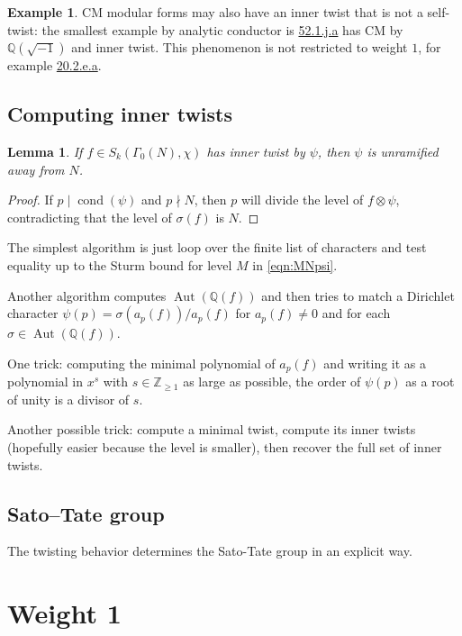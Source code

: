 \documentclass[11pt]{amsart}
\numberwithin{equation}{subsection}
\theoremstyle{plain}
\newtheorem{lem}[equation]{Lemma}
\theoremstyle{definition}
\newtheorem{exm}[equation]{Example}
\newcommand{\Q}{\mathbb{Q}}
\newcommand{\Z}{\mathbb{Z}}
\DeclareMathOperator{\Aut}{Aut}
\DeclareMathOperator{\cond}{cond}
\begin{document}
\begin{exm}
CM modular forms may also have an inner twist that is not a self-twist: the smallest example by analytic conductor is \href{http://cmfs.lmfdb.xyz/ModularForm/GL2/Q/holomorphic/52/1/j/a/}{\textsf{52.1.j.a}} has CM by $\Q(\sqrt{-1})$ and inner twist.  This phenomenon is not restricted to weight $1$, for example \href{http://cmfs.lmfdb.xyz/ModularForm/GL2/Q/holomorphic/20/2/e/a/}{\textsf{20.2.e.a}}.
\end{exm}

\subsection{Computing inner twists}

\begin{lem}
If $f \in S_k(\Gamma_0(N),\chi)$ has inner twist by $\psi$, then $\psi$ is unramified away from $N$.  
\end{lem}

\begin{proof}
If $p \mid \cond(\psi)$ and $p \nmid N$, then $p$ will divide the level of $f \otimes \psi$, contradicting that the level of $\sigma(f)$ is $N$. 
\end{proof}

The simplest algorithm is just loop over the finite list of characters and test equality up to the Sturm bound for level $M$ in \eqref{eqn:MNpsi}.  

Another algorithm computes $\Aut(\Q(f))$ and then tries to match a Dirichlet character $\psi(p)=\sigma(a_p(f))/a_p(f)$ for $a_p(f) \neq 0$ and for each $\sigma \in \Aut(\Q(f))$.  

One trick: computing the minimal polynomial of $a_p(f)$ and writing it as a polynomial in $x^s$ with $s \in \Z_{\geq 1}$ as large as possible, the order of $\psi(p)$ as a root of unity is a divisor of $s$.  

Another possible trick: compute a minimal twist, compute its inner twists (hopefully easier because the level is smaller), then recover the full set of inner twists.

\subsection{Sato--Tate group}

The twisting behavior determines the Sato-Tate group in an explicit way.  

\section{Weight 1} \label{sec:weight1}
\end{document}
